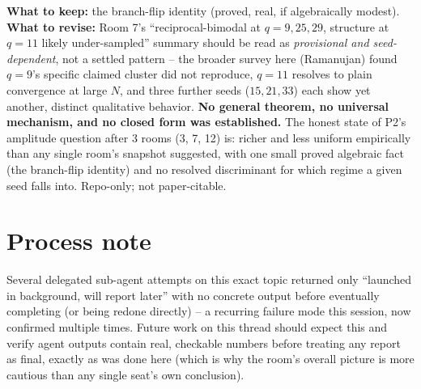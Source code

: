 \documentclass[11pt]{article}
\begin{document}
\textbf{What to keep:} the branch-flip identity (proved, real, if algebraically modest).
\textbf{What to revise:} Room 7's ``reciprocal-bimodal at $q=9,25,29$, structure at $q=11$ likely
under-sampled'' summary should be read as \emph{provisional and seed-dependent}, not a settled
pattern -- the broader survey here (Ramanujan) found $q=9$'s specific claimed cluster did not
reproduce, $q=11$ resolves to plain convergence at large $N$, and three further seeds
($15,21,33$) each show yet another, distinct qualitative behavior. \textbf{No general theorem, no
universal mechanism, and no closed form was established.} The honest state of P2's amplitude
question after 3 rooms (3, 7, 12) is: richer and less uniform empirically than any single room's
snapshot suggested, with one small proved algebraic fact (the branch-flip identity) and no
resolved discriminant for which regime a given seed falls into. Repo-only; not paper-citable.

\section*{Process note}

Several delegated sub-agent attempts on this exact topic returned only ``launched in background,
will report later'' with no concrete output before eventually completing (or being redone
directly) -- a recurring failure mode this session, now confirmed multiple times. Future work on
this thread should expect this and verify agent outputs contain real, checkable numbers before
treating any report as final, exactly as was done here (which is why the room's overall picture is
more cautious than any single seat's own conclusion).
\end{document}
